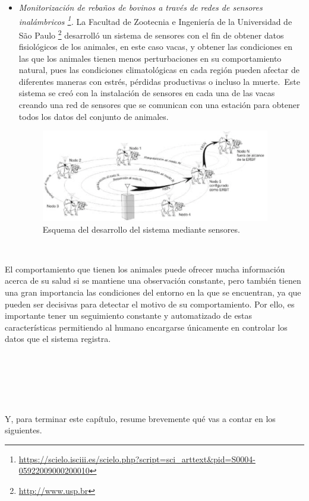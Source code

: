 \begin{itemize}
\item \textit{Monitorización de rebaños de bovinos a través de redes de sensores inalámbricos \footnote{\url{https://scielo.isciii.es/scielo.php?script=sci_arttext&pid=S0004-05922009000200010}}.} La Facultad de Zootecnia e Ingeniería de la Universidad de São Paulo \footnote{\url{http://www.usp.br}} desarrolló un sistema de sensores con el fin de obtener datos fisiológicos de los animales, en este caso vacas, y obtener las condiciones en las que los animales tienen menos perturbaciones en su comportamiento natural, pues las condiciones climatológicas en cada región pueden afectar de diferentes maneras con estrés, pérdidas productivas o incluso la muerte.\
Este sistema se creó con la instalación de sensores en cada una de las vacas creando una red de sensores que se comunican con una estación para obtener todos los datos del conjunto de animales.
\begin{figure} [h!]
  \begin{center}
    \includegraphics[width=10cm]{figs/saopaulo}
  \end{center}
  \caption{Esquema del desarrollo del sistema mediante sensores.}
  \label{fig:usao}
\end{figure}
\end{itemize}\

El comportamiento que tienen los animales puede ofrecer mucha información acerca de su salud si se mantiene una observación constante, pero también tienen una gran importancia las condiciones del entorno en la que se encuentran, ya que pueden ser decisivas para detectar el motivo de su comportamiento. Por ello, es importante tener un seguimiento constante y automatizado de estas características permitiendo al humano encargarse únicamente en controlar los datos que el sistema registra.

\

\

\

Y, para terminar este capítulo, resume brevemente qué vas a contar en los siguientes.
